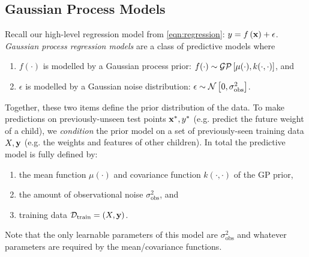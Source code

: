 \subsection{Gaussian Process Models}
Recall our high-level regression model from \cref{eqn:regression}: $y = f \left( \mathbf{x} \right) + \epsilon$.
\emph{Gaussian process regression models} are a class of predictive models where
%
\begin{enumerate}
  \item $f ( \cdot )$ is modelled by a Gaussian process prior: $f (\cdot) \sim \mathcal{GP} \left[ \mu(\cdot), k(\cdot, \cdot) \right]$, and
  \item $\epsilon$ is modelled by a Gaussian noise distribution: $\epsilon \sim \mathcal{N} \left[ 0, \sigma_\text{obs}^2 \right]$.
\end{enumerate}
%
Together, these two items define the prior distribution of the data.
To make predictions on previously-unseen test points $\mathbf{x}^*, y^*$ (e.g. predict the future weight of a child), we \emph{condition} the prior model on a set of previously-seen training data $X, \mathbf{y}$ (e.g. the weights and features of other children).
In total the predictive model is fully defined by:
\begin{enumerate}
  \item the mean function $\mu(\cdot)$ and covariance function $k(\cdot, \cdot)$ of the GP prior,
  \item the amount of observational noise $\sigma_\text{obs}^2$, and
  \item training data $\mathcal D_\text{train} = (X, \mathbf{y})$.
\end{enumerate}
%
Note that the only learnable parameters of this model are $\sigma_\text{obs}^2$ and whatever parameters are required by the mean/covariance functions.

